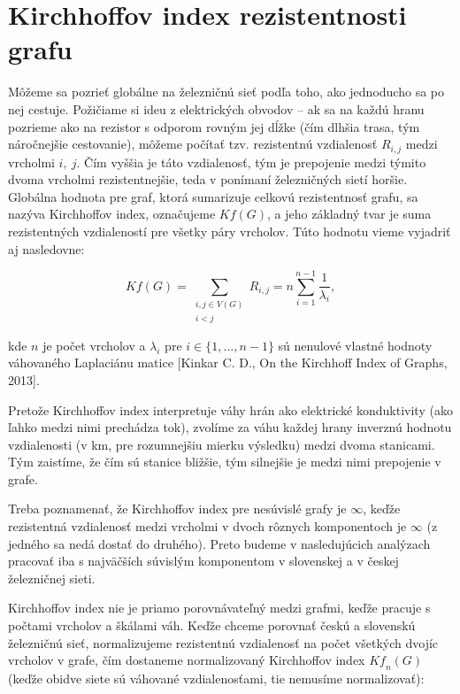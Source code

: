 \documentclass[main.tex]{subfiles}
\begin{document}
\section{Kirchhoffov index rezistentnosti grafu}
\label{sec:kirchhoff}

Môžeme sa pozrieť globálne na železničnú sieť podľa toho, ako jednoducho sa po nej cestuje. Požičiame si ideu z elektrických obvodov -- ak sa na každú hranu pozrieme ako na rezistor s odporom rovným jej dĺžke (čím dlhšia trasa, tým náročnejšie cestovanie), môžeme počítať tzv. rezistentnú vzdialenosť $R_{i,j}$ medzi vrcholmi $i,~j$. Čím vyššia je táto vzdialenosť, tým je prepojenie medzi týmito dvoma vrcholmi rezistentnejšie, teda v ponímaní železničných sietí horšie. Globálna hodnota pre graf, ktorá sumarizuje celkovú rezistentnosť grafu, sa nazýva Kirchhoffov index, označujeme $\mathit{Kf}(G)$, a jeho základný tvar je suma rezistentných vzdialeností pre všetky páry vrcholov. Túto hodnotu vieme vyjadriť aj nasledovne:

\begin{equation*}
	\mathit{Kf}(G) = \sum_{\substack{i, j \in V(G) \\ i < j}} R_{i,j} = n\sum_{i=1}^{n-1} \frac{1}{\lambda_i},
\end{equation*}

\noindent kde $n$ je počet vrcholov a $\lambda_i$ pre $i \in \{1, \dots, n-1\}$ sú nenulové vlastné hodnoty váhovaného Laplaciánu matice [Kinkar C. D., On the Kirchhoff Index of Graphs, 2013]. 

Pretože Kirchhoffov index interpretuje váhy hrán ako elektrické konduktivity (ako ľahko medzi nimi prechádza tok), zvolíme za váhu každej hrany inverznú hodnotu vzdialenosti (v km, pre rozumnejšiu mierku výsledku) medzi dvoma stanicami. Tým zaistíme, že čím sú stanice bližšie, tým silnejšie je medzi nimi prepojenie v grafe. 

Treba poznamenať, že Kirchhoffov index pre nesúvislé grafy je $\infty$, keďže rezistentná vzdialenosť medzi vrcholmi v dvoch rôznych komponentoch je $\infty$ (z jedného sa nedá dostať do druhého). Preto budeme v nasledujúcich analýzach pracovať iba s najväčších súvislým komponentom v slovenskej a v českej železničnej sieti.

Kirchhoffov index nie je priamo porovnávateľný medzi grafmi, keďže pracuje s počtami vrcholov a škálami váh. Keďže chceme porovnať českú a slovenskú železničnú sieť, normalizujeme rezistentnú vzdialenosť na počet všetkých dvojíc vrcholov v grafe, čím dostaneme normalizovaný Kirchhoffov index $\mathit{Kf}_n(G)$ (keďže obidve siete sú váhované vzdialenosťami, tie nemusíme normalizovať):
\end{document}
